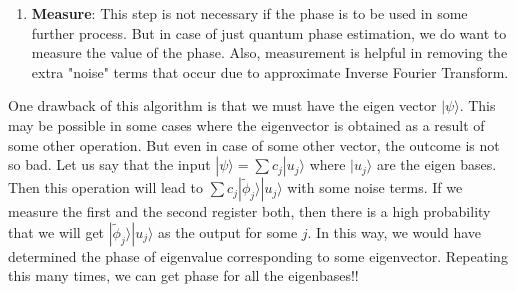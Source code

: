 \begin{enumerate}
\item \textbf{Measure}: This step is not necessary if the phase is to be used in some further process. But in case of just quantum phase estimation, we do want to measure the value of the phase. Also, measurement is helpful in removing the extra "noise" terms that occur due to approximate Inverse Fourier Transform.
\end{enumerate}
One drawback of this algorithm is that we must have the eigen vector $|\psi\rangle$. This may be possible in some cases where the eigenvector is obtained as a result of some other operation. But even in case of some other vector, the outcome is not so bad. Let us say that the input $|\psi\rangle = \sum c_j |u_j\rangle$ where $|u_j\rangle$ are the eigen bases. Then this operation will lead to $\sum c_j |\tilde{\phi}_j\rangle |u_j\rangle$ with some noise terms. If we measure the first and the second register both, then there is a high probability that we will get $|\tilde{\phi}_j\rangle |u_j\rangle$ as the output for some $j$. In this way, we would have determined the phase of eigenvalue corresponding to some eigenvector. Repeating this many times, we can get phase for all the eigenbases!!
\newpage
